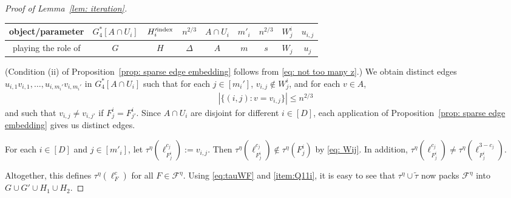\documentclass[a4paper, 11pt, reqno]{amsart}
\numberwithin{equation}{section}
\newcommand{\1}{{\rm 1\hspace*{-0.4ex}%
\rule{0.1ex}{1.52ex}\hspace*{0.2ex}}}
\newcommand{\cF}{\mathcal{F}}
\newcommand{\COMMENT}[1]{}
\begin{document}
\begin{proof}[Proof of Lemma~\ref{lem: iteration}]
\noindent
{
\begin{tabular}{c|c|c|c|c|c|c|c|c}
object/parameter & $G^{*}_4[A\cap U_i]$ & $H'^{\rm index}_i$ & $ n^{2/3} $ & $A\cap U_i$ &   $m'_i$ & $n^{2/3} $  &  $W^i_j$ & $u_{i,j}$
\\ \hline
playing the role of & $G$ & $H$ & $\Delta$ & $A$ & $m$ & $s$ &$W_j$ & $u_j$
\end{tabular}
}\newline \vspace{0.2cm}

\noindent
(Condition (ii) of Proposition~\ref{prop: sparse edge embedding} follows from \eqref{eq: not too many z}.)
We obtain distinct edges $u_{i,1}v_{i,1},\ldots, u_{i,m_i'}v_{i,m_i'}$ in $G^{*}_4[A\cap U_i]$ 
such that for each $j\in[m_i']$, $v_{i,j}\notin W_j^i$, and for each $v \in A$, 
\begin{align}\label{eq: E''4 deg}
|\{(i,j): v=v_{i,j}\}|\leq n^{2/3}
\end{align}
and such that $v_{i,j}\neq v_{i,j'}$ if $F_j^i=F_{j'}^i$.
Since $A\cap U_i$ are disjoint for different $i\in [D]$, 
each application of Proposition~\ref{prop: sparse edge embedding} gives us distinct edges.

For each $i\in [D]$ and $j\in [m'_i]$, let $\tau^{\eta}(\ell^{c_j}_{F^i_j}) := v_{i,j}$.
Then $\tau^{\eta}(\ell^{c_j}_{F^i_j}) \notin \tau^{\eta}({F^i_j})$ by \eqref{eq: Wij}.
In addition, $\tau^{\eta}(\ell^{c_j}_{F^i_j})\neq \tau^{\eta}(\ell^{3-c_j}_{F^i_j})$.%
\COMMENT{If $(F^i_j,c)\in F^{\rm unmatch}_i, (F^i_j,3-c)\in F^{\rm match}_i$, then $\tau^\eta(\ell^{3-c}_{F^i_j})$ is not in $A$, so we have $\tau^\eta(\ell^{c}_{F^i_j})\neq \tau^\eta(\ell^{3-c}_{F^i_j})$ since one of them is in $A$ and the other one is not in $A$. 
Otherwise, $H'^{\rm index}_i$ will ensure $\tau^\eta(\ell^{c}_{F^i_j})\neq \tau^\eta(\ell^{3-c}_{F^i_j})$}
Altogether, this defines $\tau^\eta(\ell^c_F)$ for all $F\in \cF^{\eta}$.
Using \eqref{eq:tauWF} and \ref{item:Q11i}, it is easy to see that
$\tau^\eta\cup \tilde{\tau}$ now packs $\cF^\eta$ into $G\cup G'\cup H_1 \cup H_2$.


\end{proof}
\end{document}
